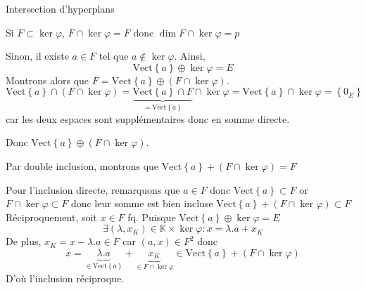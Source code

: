 \documentclass{article}
\begin{document}
	\begin{question_kholle}
		[{Soient $E$ un $\mathbb{K}$-espace vectoriel, et $\varphi \in E^{*}$ une forme linéaire \emph{non nulle}. Soit $F$ un sous-espace vectoriel de $E$ de dimension finie $p \in \mathbb{N}$, alors
		\begin{equation}
			\dim_{\mathbb{K}}F \cap \ker \varphi =
			\left\{ \begin{array}{ll}
				p  & \text{ si } F \subset \ker \varphi \\
				p-1  & \text{ sinon}
			\end{array}\right.
		\end{equation}
		En particulier, on a toujours $\dim_{\mathbb{K}}F \cap \ker F \geqslant p-1$}]
		{Intersection d'hyperplans}
		
		Si $F \subset \ker\varphi$, $F \cap \ker \varphi = F$ donc $\dim F \cap \ker \varphi = p$
		
		Sinon, il existe $a \in F$ tel que $a \not\in \ker \varphi$. Ainsi,
		$$
		\text{Vect}\left\{ a \right\}  \oplus \ker \varphi = E
		$$
		Montrons alors que $F = \text{Vect} \left\{ a \right\} \oplus (F \cap \ker \varphi)$.
		$$\text{Vect} \left\{ a \right\} \cap (F \cap \ker \varphi) = \underbrace{ \text{Vect} \left\{ a \right\} \cap F }_{ =\text{Vect}\left\{ a \right\}  } \cap \ker \varphi = \text{Vect}\left\{ a \right\}  \cap \ker \varphi = \left\{ 0_{E} \right\} $$ car les deux espaces sont supplémentaires donc en somme directe.
		
		Donc $\text{Vect} \left\{ a \right\} \oplus (F \cap \ker \varphi)$.
		
		Par double inclusion, montrons que $\text{Vect} \left\{ a \right\} + (F \cap \ker \varphi) = F$
		
		Pour l'inclusion directe, remarquons que $a \in F$ donc $\text{Vect}\left\{ a \right\} \subset F$ or $F \cap \ker \varphi \subset F$ donc leur somme est bien incluse $\text{Vect} \left\{ a \right\} + (F \cap \ker \varphi) \subset F$
		Réciproquement, soit $x \in F$ fq.
		Puisque $\text{Vect} \left\{ a \right\} \oplus \ker \varphi = E$
		$$
		\exists (\lambda, x_{K}) \in \mathbb{K} \times \ker \varphi : x = \lambda .a+x_{K}
		$$
		De plus, $x_{K} = x - \lambda.a \in F$ car $(a, x) \in F^{2}$ donc
		$$
		x = \underbrace{ \lambda . a }_{ \in \text{Vect} \left\{ a \right\}  } + \underbrace{ x_{K} }_{ \in F \cap \ker \varphi } \in \text{Vect} \left\{ a \right\} + (F \cap \ker \varphi)
		$$
		D'où l'inclusion réciproque.


\end{question_kholle}
\end{document}
